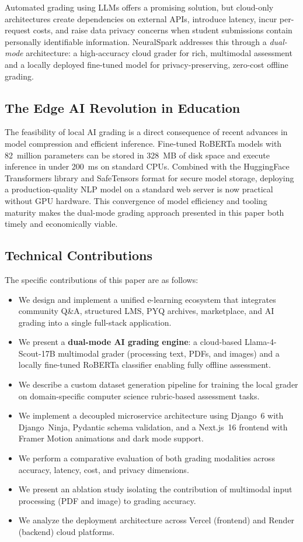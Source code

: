 \documentclass[conference]{IEEEtran}
\begin{document}
Automated grading using LLMs offers a promising solution, but cloud-only architectures create dependencies on external APIs, introduce latency, incur per-request costs, and raise data privacy concerns when student submissions contain personally identifiable information. NeuralSpark addresses this through a \textit{dual-mode} architecture: a high-accuracy cloud grader for rich, multimodal assessment and a locally deployed fine-tuned model for privacy-preserving, zero-cost offline grading.

\subsection{The Edge AI Revolution in Education}
The feasibility of local AI grading is a direct consequence of recent advances in model compression and efficient inference. Fine-tuned RoBERTa models with 82~million parameters can be stored in 328~MB of disk space and execute inference in under 200~ms on standard CPUs. Combined with the HuggingFace Transformers library and SafeTensors format for secure model storage, deploying a production-quality NLP model on a standard web server is now practical without GPU hardware. This convergence of model efficiency and tooling maturity makes the dual-mode grading approach presented in this paper both timely and economically viable.

\subsection{Technical Contributions}
The specific contributions of this paper are as follows:
\begin{itemize}[leftmargin=*]
    \item We design and implement a unified e-learning ecosystem that integrates community Q\&A, structured LMS, PYQ archives, marketplace, and AI grading into a single full-stack application.
    \item We present a \textbf{dual-mode AI grading engine}: a cloud-based Llama-4-Scout-17B multimodal grader (processing text, PDFs, and images) and a locally fine-tuned RoBERTa classifier enabling fully offline assessment.
    \item We describe a custom dataset generation pipeline for training the local grader on domain-specific computer science rubric-based assessment tasks.
    \item We implement a decoupled microservice architecture using Django~6 with Django~Ninja, Pydantic schema validation, and a Next.js~16 frontend with Framer Motion animations and dark mode support.
    \item We perform a comparative evaluation of both grading modalities across accuracy, latency, cost, and privacy dimensions.
    \item We present an ablation study isolating the contribution of multimodal input processing (PDF and image) to grading accuracy.
    \item We analyze the deployment architecture across Vercel (frontend) and Render (backend) cloud platforms.
\end{itemize}
\end{document}
